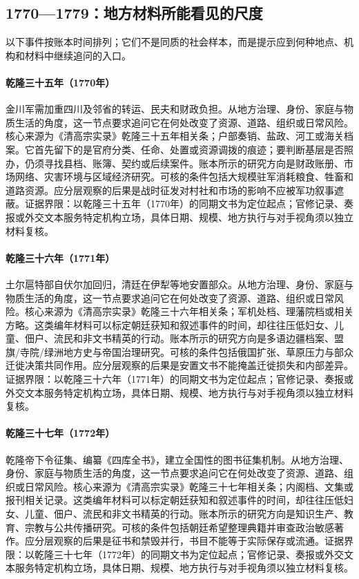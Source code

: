 \subsection{1770—1779：地方材料所能看见的尺度}
以下事件按账本时间排列；它们不是同质的社会样本，而是提示应到何种地点、机构和材料中继续追问的入口。
\hypertarget{social:EQ-1770-SICHUAN-SUPPLY-BURDEN}{}\paragraph{乾隆三十五年（1770年）}金川军需加重四川及邻省的转运、民夫和财政负担。从地方治理、身份、家庭与物质生活的角度，这一节点要求追问它在何处改变了资源、道路、组织或日常风险。核心来源为《清高宗实录》乾隆三十五年相关条；户部奏销、盐政、河工或海关档案。它首先留下的是官府分类、任命、处置或资源调拨的痕迹；要判断基层是否照办，仍须寻找县档、账簿、契约或后续案件。账本所示的研究方向是财政账册、市场网络、灾害环境与区域经济研究。可核的条件包括大规模驻军消耗粮食、牲畜和道路资源。应分层观察的后果是战时征发对村社和市场的影响不应被军功叙事遮蔽。证据界限：以乾隆三十五年（1770年）的同期文书为定位起点；官修记录、奏报或外交文本服务特定机构立场，具体日期、规模、地方执行与对手视角须以独立材料复核。
\hypertarget{social:EQ-1771-TORGHUT-RETURN}{}\paragraph{乾隆三十六年（1771年）}土尔扈特部自伏尔加回归，清廷在伊犁等地安置部众。从地方治理、身份、家庭与物质生活的角度，这一节点要求追问它在何处改变了资源、道路、组织或日常风险。核心来源为《清高宗实录》乾隆三十六年相关条；军机处档、理藩院档或相关方略。这类编年材料可以标定朝廷获知和叙述事件的时间，却往往压低妇女、儿童、佃户、流民和非文书精英的行动。账本所示的研究方向是多语边疆档案、盟旗/寺院/绿洲地方史与帝国治理研究。可核的条件包括俄国扩张、草原压力与部众迁徙决策共同作用。应分层观察的后果是安置文书不能掩盖迁徙损失和内部差异。证据界限：以乾隆三十六年（1771年）的同期文书为定位起点；官修记录、奏报或外交文本服务特定机构立场，具体日期、规模、地方执行与对手视角须以独立材料复核。
\hypertarget{social:EQ-1772-SIKU-QUANSHU-ORDER}{}\paragraph{乾隆三十七年（1772年）}乾隆帝下令征集、编纂《四库全书》，建立全国性的图书征集机制。从地方治理、身份、家庭与物质生活的角度，这一节点要求追问它在何处改变了资源、道路、组织或日常风险。核心来源为《清高宗实录》乾隆三十七年相关条；内阁档、文集或报刊相关记录。这类编年材料可以标定朝廷获知和叙述事件的时间，却往往压低妇女、儿童、佃户、流民和非文书精英的行动。账本所示的研究方向是知识生产、教育、宗教与公共传播研究。可核的条件包括朝廷希望整理典籍并审查政治敏感著作。应分层观察的后果是征书和禁毁并行，书目不能等于实际保存或流通。证据界限：以乾隆三十七年（1772年）的同期文书为定位起点；官修记录、奏报或外交文本服务特定机构立场，具体日期、规模、地方执行与对手视角须以独立材料复核。
